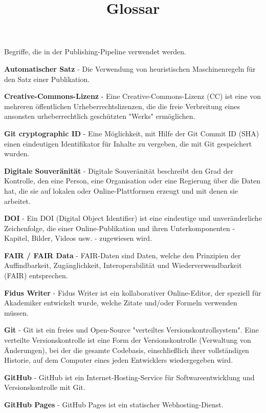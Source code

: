 \documentclass{article}
\begin{document}
\title{Glossar}

\maketitle


Begriffe, die in der Publishing-Pipeline verwendet werden.


\textbf{Automatischer Satz} - Die Verwendung von heuristischen Maschinenregeln für den Satz einer Publikation.


\textbf{Creative-Commons-Lizenz} - Eine Creative-Commons-Lizenz (CC) ist eine von mehreren öffentlichen Urheberrechtslizenzen, die die freie Verbreitung eines ansonsten urheberrechtlich geschützten "Werks" ermöglichen.


\textbf{Git cryptographic ID} - Eine Möglichkeit, mit Hilfe der Git Commit ID (SHA) einen eindeutigen Identifikator für Inhalte zu vergeben, die mit Git gespeichert wurden.


\textbf{Digitale Souveränität} - Digitale Souveränität beschreibt den Grad der Kontrolle, den eine Person, eine Organisation oder eine Regierung über die Daten hat, die sie auf lokalen oder Online-Plattformen erzeugt und mit denen sie arbeitet.


\textbf{DOI} - Ein DOI (Digital Object Identifier) ist eine eindeutige und unveränderliche Zeichenfolge, die einer Online-Publikation und ihren Unterkomponenten - Kapitel, Bilder, Videos usw. - zugewiesen wird.


\textbf{FAIR / FAIR Data} - FAIR-Daten sind Daten, welche den Prinzipien der Auffindbarkeit, Zugänglichkeit, Interoperabilität und Wiederverwendbarkeit (FAIR) entsprechen.


\textbf{Fidus Writer} - Fidus Writer ist ein kollaborativer Online-Editor, der speziell für Akademiker entwickelt wurde, welche Zitate und/oder Formeln verwenden müssen.


\textbf{Git} - Git ist ein freies und Open-Source "verteiltes Versionskontrollsystem". Eine verteilte Versionskontrolle ist eine Form der Versionskontrolle (Verwaltung von Änderungen), bei der die gesamte Codebasis, einschließlich ihrer vollständigen Historie, auf dem Computer eines jeden Entwicklers wiedergegeben wird.


\textbf{GitHub} - GitHub ist ein Internet-Hosting-Service für Softwareentwicklung und Versionskontrolle mit Git.


\textbf{GitHub Pages} - GitHub Pages ist ein statischer Webhosting-Dienst.
\end{document}
